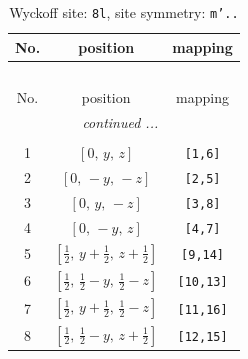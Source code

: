 \documentclass[fleqn,8pt]{jsarticle}
\begin{document}
\begin{longtable}{ccc}
\caption{Wyckoff site: {\tt 8l}, site symmetry: {\tt m'..}}
 \\
 \hline \hline
No. & position & mapping \\ \hline \endfirsthead

\multicolumn{2}{l}{\tablename\ \thetable{}} \\
 \hline \hline
No. & position & mapping \\ \hline \endhead

 \hline \hline
\multicolumn{2}{r}{\footnotesize\it continued ...} \\ \endfoot

 \hline \hline
\multicolumn{2}{r}{} \\ \endlastfoot

1 & $\left[ 0,\, y,\, z \right]$ & {\tt [1,6]} \\ \hline
2 & $\left[ 0,\, - y,\, - z \right]$ & {\tt [2,5]} \\ \hline
3 & $\left[ 0,\, y,\, - z \right]$ & {\tt [3,8]} \\ \hline
4 & $\left[ 0,\, - y,\, z \right]$ & {\tt [4,7]} \\ \hline
5 & $\left[ \frac{1}{2},\, y + \frac{1}{2},\, z + \frac{1}{2} \right]$ & {\tt [9,14]} \\ \hline
6 & $\left[ \frac{1}{2},\, \frac{1}{2} - y,\, \frac{1}{2} - z \right]$ & {\tt [10,13]} \\ \hline
7 & $\left[ \frac{1}{2},\, y + \frac{1}{2},\, \frac{1}{2} - z \right]$ & {\tt [11,16]} \\ \hline
8 & $\left[ \frac{1}{2},\, \frac{1}{2} - y,\, z + \frac{1}{2} \right]$ & {\tt [12,15]} \\
\end{longtable}
\renewcommand{\arraystretch}{1.2}
\end{document}
